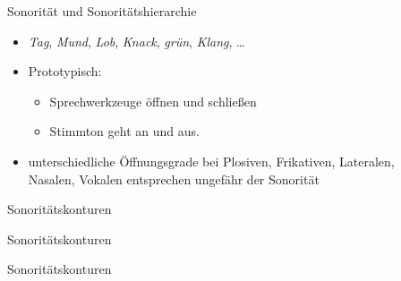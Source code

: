 \begin{frame}[fragile]
  {Sonorität und Sonoritätshierarchie}
  \pause
  \begin{itemize}[<+->]
    \item \textit{Tag}, \textit{Mund}, \textit{Lob}, \textit{Knack}, \textit{grün}, \textit{Klang}, \dots
      \Zeile
    \item Prototypisch:
      \begin{itemize}[<+->]
        \item \alert{Sprechwerkzeuge öffnen und schließen}
        \item \alert{Stimmton geht an und aus.}
      \end{itemize}
      \Zeile
    \item unterschiedliche Öffnungsgrade bei Plosiven, Frikativen, Lateralen,\\
      Nasalen, Vokalen entsprechen ungefähr der \alert{Sonorität}
  \end{itemize}
  \pause
  \begin{center}
  \end{center}
\end{frame}


\begin{frame}[fragile]
  {Sonoritätskonturen}
  \pause
  \begin{center}
  \end{center}
\end{frame}

\begin{frame}[fragile]
  {Sonoritätskonturen}
  \begin{center}
  \end{center}
\end{frame}

\begin{frame}[fragile]
  {Sonoritätskonturen}
  \begin{center}
  \end{center}
\end{frame}

